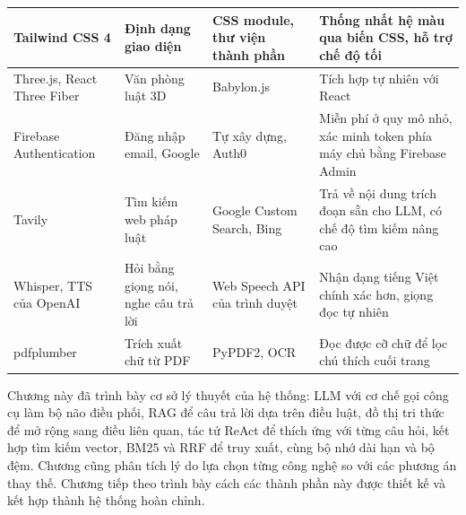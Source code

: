 \documentclass[../DoAn.tex]{subfiles}
\begin{document}
\begin{longtable}{|L{2.3cm}|L{3.1cm}|L{3.0cm}|L{4.9cm}|}
Tailwind CSS 4 & Định dạng giao diện & CSS module, thư viện thành phần & Thống nhất hệ màu qua biến CSS, hỗ trợ chế độ tối \\ \hline
Three.js, React Three Fiber & Văn phòng luật 3D & Babylon.js & Tích hợp tự nhiên với React \\ \hline
Firebase Authentication & Đăng nhập email, Google & Tự xây dựng, Auth0 & Miễn phí ở quy mô nhỏ, xác minh token phía máy chủ bằng Firebase Admin \\ \hline
Tavily & Tìm kiếm web pháp luật & Google Custom Search, Bing & Trả về nội dung trích đoạn sẵn cho LLM, có chế độ tìm kiếm nâng cao \\ \hline
Whisper, TTS của OpenAI & Hỏi bằng giọng nói, nghe câu trả lời & Web Speech API của trình duyệt & Nhận dạng tiếng Việt chính xác hơn, giọng đọc tự nhiên \\ \hline
pdfplumber & Trích xuất chữ từ PDF & PyPDF2, OCR & Đọc được cỡ chữ để lọc chú thích cuối trang \\ \hline
\end{longtable}

Chương này đã trình bày cơ sở lý thuyết của hệ thống: LLM với cơ chế gọi công cụ làm bộ não điều phối, RAG để câu trả lời dựa trên điều luật, đồ thị tri thức để mở rộng sang điều liên quan, tác tử ReAct để thích ứng với từng câu hỏi, kết hợp tìm kiếm vector, BM25 và RRF để truy xuất, cùng bộ nhớ dài hạn và bộ đệm. Chương cũng phân tích lý do lựa chọn từng công nghệ so với các phương án thay thế. Chương tiếp theo trình bày cách các thành phần này được thiết kế và kết hợp thành hệ thống hoàn chỉnh.
\end{document}
